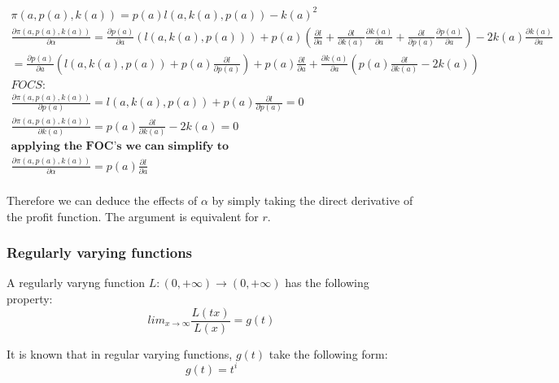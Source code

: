 \begin{align*}
\pi(a, p(a),k(a))= p(a) l(a, k(a),p(a))-k(a)^2 \\
\frac{ \partial \pi(a, p(a),k(a))}{\partial \alpha}= \frac{\partial p(a) }{\partial a } \left(
l(a, k(a),p(a)) \right)
+ p(a)\left( \frac{\partial l}{\partial a}
+\frac{\partial l}{\partial k(a)}\frac{\partial k(a)}{\partial a}
+\frac{\partial l}{\partial p(a)}\frac{\partial p(a)}{\partial a}
\right)
- 2 k(a) \frac{\partial k(a)}{\partial a}
\\ 
= \frac{\partial p(a) }{\partial a } \left(
l(a, k(a),p(a)) +p(a) \frac{\partial l}{\partial p(a)} \right)
+ p(a) \frac{\partial l}{\partial a}
+\frac{\partial k(a)}{\partial a}\left( p(a)\frac{\partial l}{\partial k(a)}-2 k(a)
 \right) \\
FOCS: 
\\
\frac{\partial \pi(a, p(a),k(a))}{\partial p(a)}=l(a, k(a),p(a))+p(a) \frac{\partial l}{\partial p(a)}=0 
\\
\frac{\partial \pi(a, p(a),k(a))}{\partial k(a)}=p(a) \frac{\partial l}{\partial k(a)} -2 k(a)=0
\\
\textbf{applying the FOC's we can simplify to}
\\
\frac{ \partial \pi(a, p(a),k(a))}{\partial \alpha}= 
p(a) \frac{\partial l}{\partial a} \\
\end{align*}

Therefore we can deduce the effects of $\alpha$ by simply taking the direct derivative of the profit function. The argument is equivalent for $r$.

\subsubsection{Regularly varying functions}

\begin{definition}
A regularly varyng function $L: (0,+ \infty) \rightarrow (0,+ \infty)$ has the following property:
\begin{equation}
lim_{x \rightarrow \infty} \frac{L(t x)}{L(x)} = g(t)
\end{equation}
\end{definition}

It is known that in regular varying functions, $g(t)$ take the following form\citep{bojanic1963slowly}:
\begin{equation}
g(t)=t^i
\end{equation}

